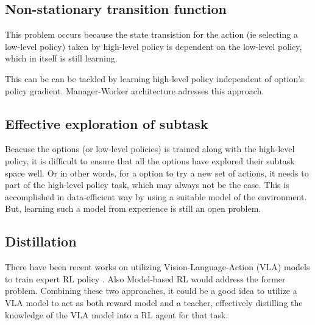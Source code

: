 \subsection{Non-stationary transition function}
This problem occurs because the state transistion for the action (ie selecting a low-level policy) taken by high-level policy is dependent on the low-level policy, which in itself is still learning.

This can be can be tackled by learning high-level policy independent of option's policy gradient. 
Manager-Worker architecture \cite{vezhnevetsFeUdalNetworksHierarchical2017} adresses this approach.

\subsection{Effective exploration of subtask}
Beacuse the options (or low-level policies) is trained along with the high-level policy, it is difficult to ensure that all the options have explored their subtask space well. Or in other words, for a option to try a new set of actions, it needs to part of the high-level policy task, which may always not be the case.
This is accomplished in data-efficient way by using a suitable model of the environment. But, learning such a model from experience is still an open problem.

\subsection{Distillation}
There have been recent works on utilizing Vision-Language-Action (VLA) models to train expert RL policy \cite{xiangVLAModelExpertCollaboration2025}. Also Model-based RL would address the former problem. 
Combining these two approaches, it could be a good idea to utilize a VLA model to act as both reward model and a teacher, effectively distilling the knowledge of the VLA model into a RL agent for that task. 


